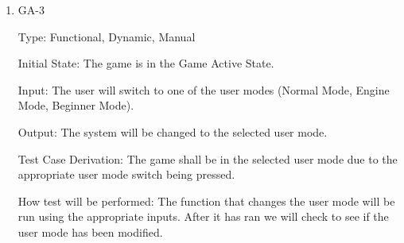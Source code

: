 \documentclass[12pt, titlepage]{article}
\begin{document}
\begin{enumerate}
\item{GA-3\\}

Type: Functional, Dynamic, Manual
                    
Initial State: The game is in the Game Active State.
                    
Input: The user will switch to one of the user modes (Normal Mode, Engine Mode, Beginner Mode).

Output: The system will be changed to the selected user mode.
                    
Test Case Derivation: The game shall be in the selected user mode due to the appropriate user mode switch being pressed.

How test will be performed: The function that changes the user mode will be run using the appropriate inputs.
After it has ran we will check to see if the user mode has been modified.


                    
                    

                    



                    
                    

                    


\end{enumerate}
\end{document}
